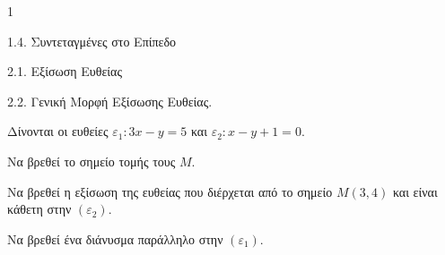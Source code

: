 \begin{ylh}{1}
    \item 1.4. Συντεταγμένες στο Επίπεδο
    \item 2.1. Εξίσωση Ευθείας
    \item 2.2. Γενική Μορφή Εξίσωσης Ευθείας.
\end{ylh}
Δίνονται οι ευθείες $\varepsilon_1: 3x - y = 5$ και $\varepsilon_2: x - y + 1 = 0$.
\begin{alist}
\item Να βρεθεί το σημείο τομής τους $M$. 
\item Να βρεθεί η εξίσωση της ευθείας που διέρχεται από το σημείο $M(3,4)$ και είναι κάθετη στην $(\varepsilon_2)$. 
\item Να βρεθεί ένα διάνυσμα παράλληλο στην $(\varepsilon_1)$. 
\end{alist}